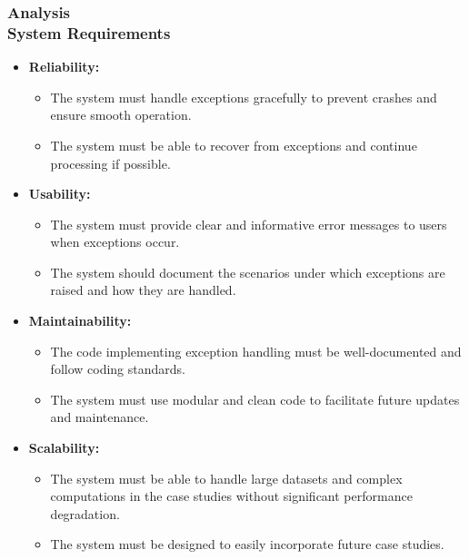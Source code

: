 \documentclass[ucs,10pt]{beamer}
\begin{document}
\begin{frame}
\frametitle{Analysis \\
	\small \color{rwth-blue} System Requirements}
	\begin{itemize}	
		\item \textbf{Reliability:}
                \begin{itemize}
                        \item The system must handle exceptions gracefully to prevent crashes and ensure smooth operation.
                        \item The system must be able to recover from exceptions and continue processing if possible.
                \end{itemize}
        	\item \textbf{Usability:}
		\begin{itemize}
			\item The system must provide clear and informative error messages to users when exceptions occur.
			\item The system should document the scenarios under which exceptions are raised and how they are handled.
		\end{itemize}
		\item \textbf{Maintainability:}
		\begin{itemize}
			\item The code implementing exception handling must be well-documented and follow coding standards.
			\item The system must use modular and clean code to facilitate future updates and maintenance.
		\end{itemize}
		\item \textbf{Scalability:}
		\begin{itemize}
			\item The system must be able to handle large datasets and complex computations in the case studies without significant performance degradation.
			\item The system must be designed to easily incorporate future case studies.
		\end{itemize}
	\end{itemize}
\end{frame}
\end{document}
